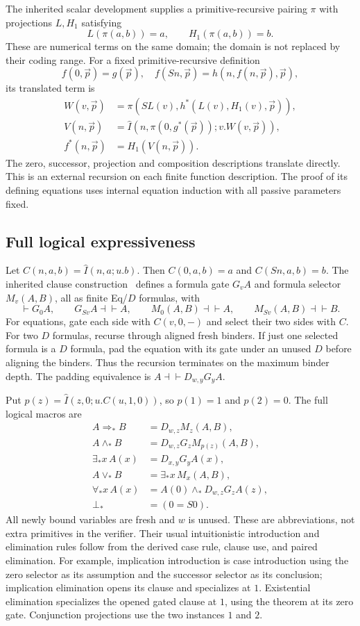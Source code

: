 The inherited scalar development supplies a primitive-recursive pairing $\pi$ with projections $L,H_1$ satisfying
\[
 L(\pi(a,b))=a,\qquad H_1(\pi(a,b))=b.
\]
These are numerical terms on the same domain; the domain is not replaced by their coding range. For a fixed primitive-recursive definition
\[
 f(0,\vec p)=g(\vec p),\quad
 f(Sn,\vec p)=h(n,f(n,\vec p),\vec p),
\]
its translated term is
\[
 \begin{split}
 W(v,\vec p)&=\pi(SL(v),h^*(L(v),H_1(v),\vec p)),\\
 V(n,\vec p)&=\widehat I(n,\pi(0,g^*(\vec p));v.W(v,\vec p)),\\
 f^*(n,\vec p)&=H_1(V(n,\vec p)).
 \end{split}
\]
The zero, successor, projection and composition descriptions translate directly. This is an external recursion on each finite function description. The proof of its defining equations uses internal equation induction with all passive parameters fixed.

\subsection{Full logical expressiveness}
Let $C(n,a,b)=\widehat I(n,a;u.b)$. Then $C(0,a,b)=a$ and $C(Sn,a,b)=b$. The inherited clause construction~\cite{clauses} defines a formula gate $G_vA$ and formula selector $M_v(A,B)$, all as finite Eq/$D$ formulas, with
\[
 \vdash G_0A,\qquad G_{Sv}A\dashv\vdash A,\qquad
 M_0(A,B)\dashv\vdash A,\qquad M_{Sv}(A,B)\dashv\vdash B.
\]
For equations, gate each side with $C(v,0,-)$ and select their two sides with $C$. For two $D$ formulas, recurse through aligned fresh binders. If just one selected formula is a $D$ formula, pad the equation with its gate under an unused $D$ before aligning the binders. Thus the recursion terminates on the maximum binder depth. The padding equivalence is $A\dashv\vdash D_{w,y}G_yA$.

Put $p(z)=\widehat I(z,0;u.C(u,1,0))$, so $p(1)=1$ and $p(2)=0$. The full logical macros are
\[
\begin{aligned}
 A\Rightarrow_*B&=D_{w,z}M_z(A,B),\\
 A\wedge_*B&=D_{w,z}G_z M_{p(z)}(A,B),\\
 \exists_*x\,A(x)&=D_{x,y}G_yA(x),\\
 A\vee_*B&=\exists_*x\,M_x(A,B),\\
 \forall_*x\,A(x)&=A(0)\wedge_*D_{w,z}G_zA(z),\\
 \bot_*&=(0=S0).
\end{aligned}
\]
All newly bound variables are fresh and $w$ is unused. These are abbreviations, not extra primitives in the verifier. Their usual intuitionistic introduction and elimination rules follow from the derived case rule, clause use, and paired elimination. For example, implication introduction is case introduction using the zero selector as its assumption and the successor selector as its conclusion; implication elimination opens its clause and specializes at $1$. Existential elimination specializes the opened gated clause at $1$, using the theorem at its zero gate. Conjunction projections use the two instances $1$ and $2$.

